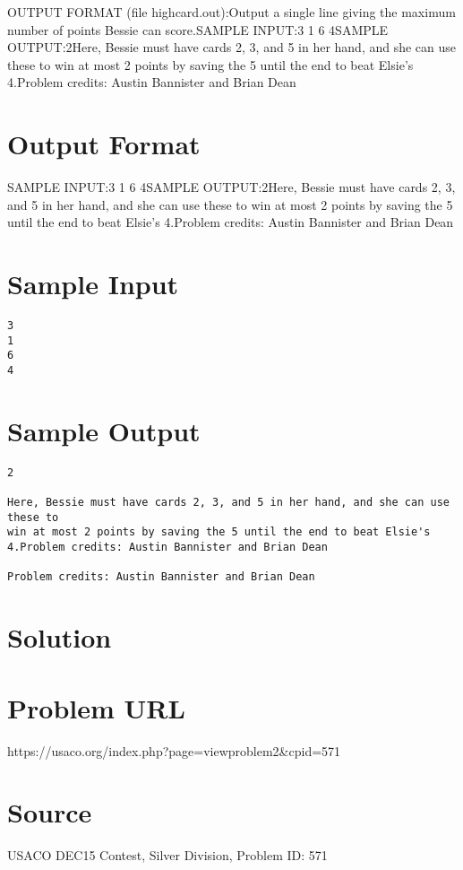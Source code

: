 \documentclass[12pt]{article}
\begin{document}
OUTPUT FORMAT (file highcard.out):Output a single line giving the maximum number of points Bessie can score.SAMPLE INPUT:3
1
6
4SAMPLE OUTPUT:2Here, Bessie must have cards 2, 3, and 5 in her hand, and she can use these to
win at most 2 points by saving the 5 until the end to beat Elsie's 4.Problem credits: Austin Bannister and Brian Dean

\section*{Output Format}
SAMPLE INPUT:3
1
6
4SAMPLE OUTPUT:2Here, Bessie must have cards 2, 3, and 5 in her hand, and she can use these to
win at most 2 points by saving the 5 until the end to beat Elsie's 4.Problem credits: Austin Bannister and Brian Dean

\section*{Sample Input}
\begin{verbatim}
3
1
6
4
\end{verbatim}

\section*{Sample Output}
\begin{verbatim}
2

Here, Bessie must have cards 2, 3, and 5 in her hand, and she can use these to
win at most 2 points by saving the 5 until the end to beat Elsie's 4.Problem credits: Austin Bannister and Brian Dean

Problem credits: Austin Bannister and Brian Dean
\end{verbatim}

\section*{Solution}


\section*{Problem URL}
https://usaco.org/index.php?page=viewproblem2&cpid=571

\section*{Source}
USACO DEC15 Contest, Silver Division, Problem ID: 571
\end{document}

